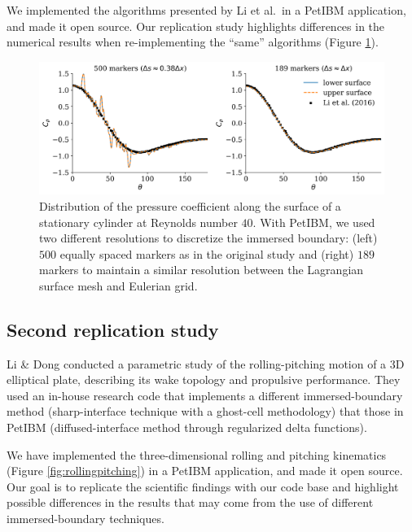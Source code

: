 \documentclass{parcfd}
\begin{document}
We implemented the algorithms presented by Li et al.\ in a PetIBM application, and made it open source.
Our replication study highlights differences in the numerical results when re-implementing the ``same'' algorithms (Figure \ref{fig:cylinder2dRe40:pressure_coefficient}).

\begin{figure}
    \centering
    \includegraphics[width=0.8\linewidth]{cylinder2dRe40_pressure_coefficient.png}
    \caption{\small Distribution of the pressure coefficient along the surface of a stationary cylinder at Reynolds number $40$. With PetIBM, we used two different resolutions to discretize the immersed boundary: (left) $500$ equally spaced markers as in the original study \cite{li_et_al_2016} and (right) $189$ markers to maintain a similar resolution between the Lagrangian surface mesh and Eulerian grid.}
    \label{fig:cylinder2dRe40:pressure_coefficient}
\end{figure}

\subsection{Second replication study}

Li \& Dong \cite{li_dong_2016} conducted a parametric study of the rolling-pitching motion of a 3D elliptical plate, describing its wake topology and propulsive performance.
They used an in-house research code that implements a different immersed-boundary method (sharp-interface technique with a ghost-cell methodology) that those in PetIBM (diffused-interface method through regularized delta functions).

We have implemented the three-dimensional rolling and pitching kinematics (Figure \ref{fig:rollingpitching}) in a PetIBM application, and made it open source.
Our goal is to replicate the scientific findings with our code base and highlight possible differences in the results that may come from the use of different immersed-boundary techniques.
\end{document}
